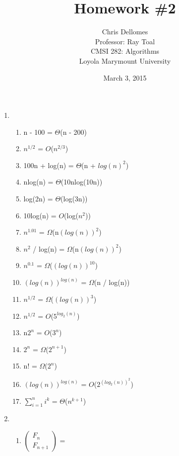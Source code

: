 \documentclass{article}
\begin{document}
\title{Homework \#2}
\author{Chris Dellomes\\
Professor: Ray Toal\\
CMSI 282: Algorithms\\
	Loyola Marymount University}

\date{March 3, 2015}

\maketitle

\clearpage

\setcounter{page}{1}

\begin{enumerate}
	\item \begin{enumerate}
		\item n - 100 = $\Theta$(n - 200)
		\item $n^{1/2}$ = $O$($n^{2/3}$)
		\item 100n + log(n) = $\Theta$(n + $log(n)^{2}$)
		\item nlog(n)  =  $\Theta$(10nlog(10n))
		\item log(2n) = $\Theta$(log(3n))
		\item 10log(n) = $O$(log($n^{2}$))
		\item $n^{1.01}$ = $\Omega$(n$(log(n))^{2}$)
		\item $n^{2}$ / log(n) = $\Omega$(n$(log(n))^{2}$)
		\item $n^{0.1}$ = $\Omega$($(log(n))^{10}$)
		\item $(log(n))^{log(n)}$ = $\Omega$(n / log(n))
		\item $n^{1/2}$ = $\Omega$($(log(n))^{3}$)
		\item $n^{1/2}$ = $O$($5^{log_{2}(n)}$)
		\item n$2^{n}$ = $O$($3^{n}$)
		\item $2^{n}$ = $\Omega$($2^{n+1}$)
		\item n! = $\Omega$($2^{n}$)
		\item $(log(n))^{log(n)}$ = $O$($2^{(log_{2}(n))^{2}}$)
		\item $\sum\limits_{i=1}^n i^{k}$ = $\Theta$($n^{k+1}$)
	\end{enumerate}
	\item \begin{enumerate}
		\item $\begin{pmatrix}
		F_{n}\\
		F_{n+1}
		\end{pmatrix}$ = %

\end{enumerate}
\end{enumerate}
\end{document}
